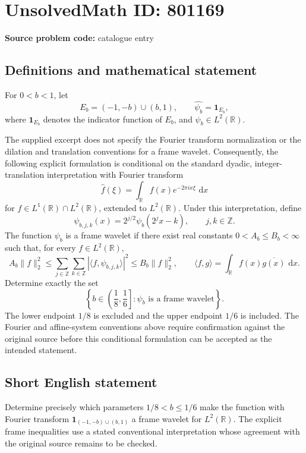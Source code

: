 \documentclass[11pt]{article}
\newcommand{\Z}{\mathbb{Z}}
\newcommand{\R}{\mathbb{R}}
\newcommand{\dd}{\,\mathrm{d}}
\begin{document}
\section*{UnsolvedMath ID: 801169}
\textbf{Source problem code:} catalogue entry
\subsection{Definitions and mathematical statement}
For \(0<b<1\), let
\[
E_b=(-1,-b)\cup(b,1),\qquad \widehat{\psi_b}=\mathbf{1}_{E_b},
\]
where \(\mathbf{1}_{E_b}\) denotes the indicator function of \(E_b\), and \(\psi_b\in L^2(\R)\).

The supplied excerpt does not specify the Fourier transform normalization or the dilation and translation conventions for a frame wavelet. Consequently, the following explicit formulation is conditional on the standard dyadic, integer-translation interpretation with Fourier transform
\[
\widehat f(\xi)=\int_{\R}f(x)e^{-2\pi i x\xi}\,\dd x
\]
for \(f\in L^1(\R)\cap L^2(\R)\), extended to \(L^2(\R)\). Under this interpretation, define
\[
\psi_{b,j,k}(x)=2^{j/2}\psi_b(2^j x-k),\qquad j,k\in\Z.
\]
The function \(\psi_b\) is a frame wavelet if there exist real constants \(0<A_b\le B_b<\infty\) such that, for every \(f\in L^2(\R)\),
\[
A_b\|f\|_2^2
\le \sum_{j\in\Z}\sum_{k\in\Z}
\left|\langle f,\psi_{b,j,k}\rangle\right|^2
\le B_b\|f\|_2^2,
\qquad
\langle f,g\rangle=\int_{\R}f(x)\overline{g(x)}\,\dd x.
\]
Determine exactly the set
\[
\left\{b\in\left(\frac18,\frac16\right]:
\psi_b\text{ is a frame wavelet}\right\}.
\]
The lower endpoint \(1/8\) is excluded and the upper endpoint \(1/6\) is included. The Fourier and affine-system conventions above require confirmation against the original source before this conditional formulation can be accepted as the intended statement.
\subsection{Short English statement}
Determine precisely which parameters \(1/8<b\le 1/6\) make the function with Fourier transform \(\mathbf{1}_{(-1,-b)\cup(b,1)}\) a frame wavelet for \(L^2(\R)\). The explicit frame inequalities use a stated conventional interpretation whose agreement with the original source remains to be checked.
\end{document}
